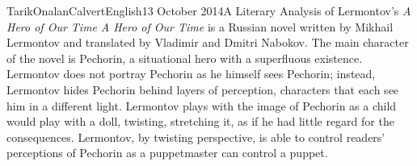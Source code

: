 \documentclass[12pt]{article}
\begin{document}
    \begin{mla}{Tarik}{Onalan}{Calvert}{English}{13 October 2014}{A Literary Analysis of Lermontov's \textit{A Hero of Our Time}}
        \textit{A Hero of Our Time} is a Russian novel written by Mikhail Lermontov
        and translated by Vladimir and Dmitri Nabokov. The main character of the
        novel is Pechorin, a situational hero with a superfluous existence. Lermontov
        does not portray Pechorin as he himself sees Pechorin; instead, Lermontov
        hides Pechorin behind layers of perception, characters that each see him
        in a different light. Lermontov plays with the image of Pechorin as a child
        would play with a doll, twisting, stretching it, as if he had little regard
        for the consequences. Lermontov, by twisting perspective, is able to control
        readers' perceptions of Pechorin as a puppetmaster can control a puppet.
    \end{mla}
\end{document}
